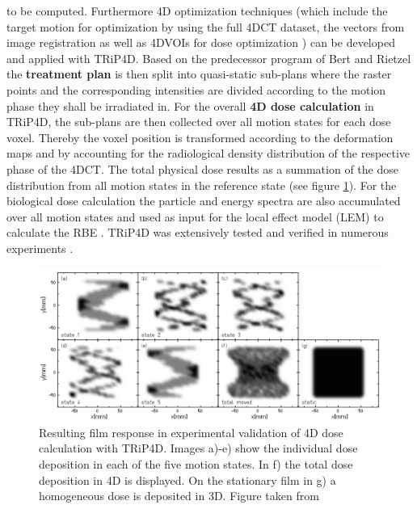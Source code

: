 to be computed. Furthermore 4D optimization techniques (which include the target motion for optimization by using the full 4DCT dataset, the 
vectors from image registration as well as 4DVOIs for dose optimization \cite{Gra13, Ele12}) can be developed and applied with TRiP4D.   
Based on the predecessor program of Bert and Rietzel the \textbf{treatment plan} is then split into quasi-static sub-plans 
where the raster points and the corresponding intensities are divided according to the motion phase they shall be irradiated in. 
For the overall \textbf{4D dose calculation} in TRiP4D, the sub-plans are then collected over all motion states for each dose voxel. Thereby 
the voxel position is transformed according to the deformation maps and by accounting for the radiological density distribution of 
the respective phase of the 4DCT. The total physical dose results as a summation of the dose distribution from all motion states in 
the reference state (see figure \ref{TRiP4Ddose}).  For the biological dose calculation the particle and energy spectra are also accumulated 
over all motion states and used as input for the local effect model (LEM) to calculate the RBE \cite{Scho94, Scho96, Gru12}. 
TRiP4D was extensively tested and verified in numerous experiments \cite{Ric12, Ric13}.  

\vspace*{-0.3cm}

\begin{figure}[H]
\begin{center}
\includegraphics[scale=0.35]{./teile/introduction/4DtreatmentPlanning.png}
\caption{Resulting film response in experimental validation of 4D dose calculation with TRiP4D. Images a)-e) show the individual dose 
deposition in each of the five motion states. In f) the total dose deposition in 4D is displayed. On the stationary film in g) a homogeneous 
dose is deposited in 3D. Figure taken from \cite{Ric12}}
\label{TRiP4Ddose}
\end{center}
\end{figure}



